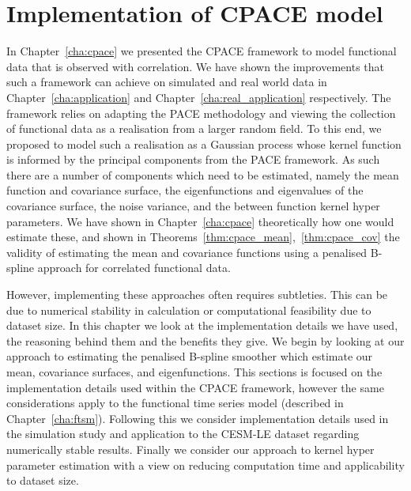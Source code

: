 
\chapter{Implementation of CPACE model \label{cha:implementation}}  %

\ifpdf
	\graphicspath{{Chapter8/Figs/Raster/}{Chapter8/Figs/PDF/}{Chapter8/Figs/}}
\else
	\graphicspath{{Chapter8/Figs/Vector/}{Chapter8/Figs/}}
\fi

In Chapter~\ref{cha:cpace} we presented the CPACE framework to model functional data that is observed with correlation.
We have shown the improvements that such a framework can achieve on simulated and real world data in Chapter~\ref{cha:application} and Chapter~\ref{cha:real_application} respectively.
The framework relies on adapting the PACE methodology and viewing the collection of functional data as a realisation from a larger random field.
To this end, we proposed to model such a realisation as a Gaussian process whose kernel function is informed by the principal components from the PACE framework.
As such there are a number of components which need to be estimated, namely the mean function and covariance surface, the eigenfunctions and eigenvalues of the covariance surface, the noise variance, and the between function kernel hyper parameters.
We have shown in Chapter~\ref{cha:cpace} theoretically how one would estimate these, and shown in Theorems~\ref{thm:cpace_mean},~\ref{thm:cpace_cov} the validity of estimating the mean and covariance functions using a penalised B-spline approach for correlated functional data.

However, implementing these approaches often requires subtleties.
This can be due to numerical stability in calculation or computational feasibility due to dataset size.
In this chapter we look at the implementation details we have used, the reasoning behind them and the benefits they give.
We begin by looking at our approach to estimating the penalised B-spline smoother which estimate our mean, covariance surfaces, and eigenfunctions.
This sections is focused on the implementation details used within the CPACE framework, however the same considerations apply to the functional time series model (described in Chapter~\ref{cha:ftsm}).
Following this we consider implementation details used in the simulation study and application to the CESM-LE dataset regarding numerically stable results.
Finally we consider our approach to kernel hyper parameter estimation with a view on reducing computation time and applicability to dataset size. 


